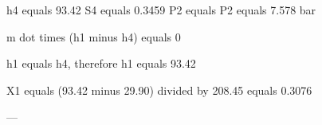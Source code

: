 h4 equals 93.42  
S4 equals 0.3459  
P2 equals P2 equals 7.578 bar  

m dot times (h1 minus h4) equals 0  

h1 equals h4, therefore h1 equals 93.42  

X1 equals (93.42 minus 29.90) divided by 208.45 equals 0.3076  

---